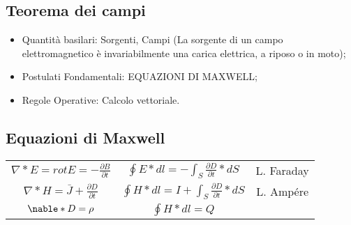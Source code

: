 \documentclass{book}
\begin{document}
\subsection{Teorema dei campi}
\begin{itemize}
\item Quantità basilari: Sorgenti, Campi (La sorgente di un
  campo elettromagnetico è invariabilmente una carica elettrica, a riposo o in moto);
\item Postulati Fondamentali: EQUAZIONI DI MAXWELL;
\item Regole Operative: Calcolo vettoriale.
\end{itemize}
\subsection{Equazioni di Maxwell}
\begin{tabular}{|c|c|c|}
  $\nabla * E = rot E = - \frac{\partial B}{\partial t}$ & $\oint E*dl=-\int_S\frac{\partial D}{\partial t}*dS$ & L. Faraday \\
  $\nabla * H = \bar{J}+ \frac{\partial D}{\partial t}$
  & $\oint H*dl=I+\int_S\frac{\partial D}{\partial t} * dS$
                                                                                                                & L. Ampére\\
  $\nable*D=\rho$ & $\oint H*dl=Q$ & 
\end{tabular}
\end{document}

